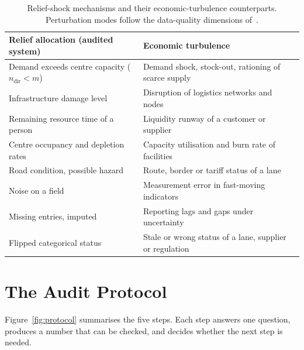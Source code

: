 \documentclass[systems,article,submit,moreauthors,pdftex]{Definitions/mdpi}
\begin{document}
\begin{table}[H]
\centering
\caption{Relief-shock mechanisms and their economic-turbulence counterparts. Perturbation
modes follow the data-quality dimensions of~\cite{wang1996dataquality}.\label{tab:mapping}}
\small
\begin{tabularx}{\textwidth}{>{\raggedright\arraybackslash}X>{\raggedright\arraybackslash}X}
\toprule
Relief allocation (audited system) & Economic turbulence\\
\midrule
Demand exceeds centre capacity ($n_{\mathrm{dir}} < m$) & Demand shock, stock-out, rationing of scarce supply\\
Infrastructure damage level & Disruption of logistics networks and nodes~\cite{ivanov2020viability}\\
Remaining resource time of a person & Liquidity runway of a customer or supplier\\
Centre occupancy and depletion rates & Capacity utilisation and burn rate of facilities\\
Road condition, possible hazard & Route, border or tariff status of a lane\\
\midrule
Noise on a field & Measurement error in fast-moving indicators\\
Missing entries, imputed & Reporting lags and gaps under uncertainty~\cite{bloom2009uncertainty,baker2016epu}\\
Flipped categorical status & Stale or wrong status of a lane, supplier or regulation\\
\bottomrule
\end{tabularx}
\end{table}

\section{The Audit Protocol}\label{sec:protocol}

Figure~\ref{fig:protocol} summarises the five steps. Each step answers one question,
produces a number that can be checked, and decides whether the next step is needed.
\end{document}
